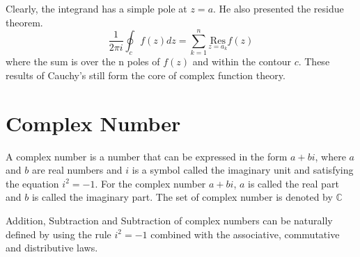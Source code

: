 \documentclass[12pt]{report}
\newcommand{\NI}{\noindent}
\begin{document}
	\NI Clearly, the integrand has a simple pole at $z=a$. He also presented the residue theorem.
	\begin{equation}
		\frac{1}{2\pi i}\oint_c f(z)dz = \sum_{k=1}^{n}\underset{z=a_k}{\text{Res}}f(z)
	\end{equation}
	where the sum is over the n poles of $f(z)$ and within the contour $c$. These results of Cauchy's still form the core of complex function theory.
	
	\section{Complex Number}
	A complex number is a number that can be expressed in the form $a+bi$, where $a$ and $b$ are real numbers and $i$ is a symbol called the imaginary unit and satisfying the equation $i^2=-1$. For the complex number $a+bi$, $a$ is called the real part and $b$ is called the imaginary part. The set of complex number is denoted by $\mathbb{C}$\\
	\begin{center}
	\end{center}
	Addition, Subtraction and Subtraction of complex numbers can be naturally defined by using the rule $i^2=-1$ combined with the associative, commutative and distributive laws.
	
\end{document}
